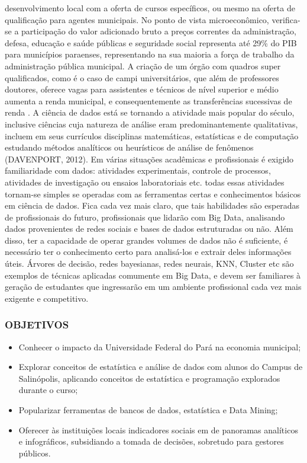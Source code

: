 \documentclass[]{article}
\providecommand{\tightlist}{%
  \setlength{\itemsep}{0pt}\setlength{\parskip}{0pt}}
\begin{document}
desenvolvimento local com a oferta de cursos específicos, ou mesmo na
oferta de qualificação para agentes municipais. No ponto de vista
microeconômico, verifica-se a participação do valor adicionado bruto a
preços correntes da administração, defesa, educação e saúde públicas e
seguridade social representa até 29\% do PIB para municípios paraenses,
representando na sua maioria a força de trabalho da administração
pública municipal. A criação de um órgão com quadros super qualificados,
como é o caso de campi universitários, que além de professores doutores,
oferece vagas para assistentes e técnicos de nível superior e médio
aumenta a renda municipal, e consequentemente as transferências
sucessivas de renda . A ciência de dados está se tornando a atividade
mais popular do século, inclusive ciências cuja natureza de análise eram
predominantemente qualitativas, incluem em seus currículos disciplinas
matemáticas, estatísticas e de computação estudando métodos analíticos
ou heurísticos de análise de fenômenos (DAVENPORT, 2012). Em várias
situações acadêmicas e profissionais é exigido familiaridade com dados:
atividades experimentais, controle de processos, atividades de
investigação ou ensaios laboratoriais etc. todas essas atividades
tornam-se simples se operadas com as ferramentas certas e conhecimentos
básicos em ciência de dados. Fica cada vez mais claro, que tais
habilidades são esperadas de profissionais do futuro, profissionais que
lidarão com Big Data, analisando dados provenientes de redes sociais e
bases de dados estruturadas ou não. Além disso, ter a capacidade de
operar grandes volumes de dados não é suficiente, é necessário ter o
conhecimento certo para analisá-los e extrair deles informações úteis.
Árvores de decisão, redes bayesianas, redes neurais, KNN, Cluster etc
são exemplos de técnicas aplicadas comumente em Big Data, e devem ser
familiares à geração de estudantes que ingressarão em um ambiente
profissional cada vez mais exigente e competitivo.

\hypertarget{objetivos}{%
\subsubsection{OBJETIVOS}\label{objetivos}}

\begin{itemize}
\tightlist
\item
  Conhecer o impacto da Universidade Federal do Pará na economia
  municipal;
\item
  Explorar conceitos de estatística e análise de dados com alunos do
  Campus de Salinópolis, aplicando conceitos de estatística e
  programação explorados durante o curso;
\item
  Popularizar ferramentas de bancos de dados, estatística e Data Mining;
\item
  Oferecer às instituições locais indicadores sociais em de panoramas
  analíticos e infográficos, subsidiando a tomada de decisões, sobretudo
  para gestores públicos.
\end{itemize}
\end{document}
